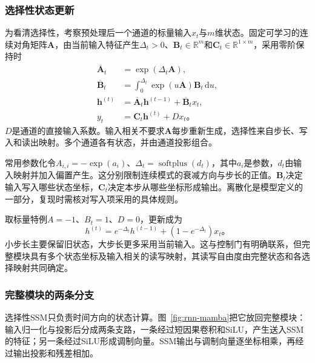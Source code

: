 \subsubsection{选择性状态更新}
\label{sec:rnn-mamba-selection}

为看清选择性，考察预处理后一个通道的标量输入$x_t$与$m$维状态。固定可学习的连续对角矩阵$\bm A$，由当前输入特征产生$\Delta_t>0$、$\bm B_t\in\mathbb R^m$和$\bm C_t\in\mathbb R^{1\times m}$，采用零阶保持时
\begin{equation}
  \begin{aligned}
    \overline{\bm A}_t&=\exp(\Delta_t\bm A),\\
    \overline{\bm B}_t&=\int_0^{\Delta_t}\exp(u\bm A)\bm B_t\,\mathrm du,\\
    \bm h^{(t)}&=\overline{\bm A}_t\bm h^{(t-1)}+\overline{\bm B}_t x_t,\\
    y_t&=\bm C_t\bm h^{(t)}+D x_t\text{。}
  \end{aligned}
  \label{eq:rnn-mamba-selection}
\end{equation}
$D$是通道的直接输入系数。输入相关不要求$\bm A$每步重新生成，选择性来自步长、写入和读出映射。多个通道各有状态，并由通道投影组合。

常用参数化令$A_{i,i}=-\exp(a_i)$、$\Delta_t=\operatorname{softplus}(d_t)$，其中$a_i$是参数，$d_t$由输入映射并加入偏置产生。这分别限制连续模式的衰减方向与步长的正值。$\bm B_t$决定输入写入哪些状态坐标，$\bm C_t$决定本步从哪些坐标形成输出。离散化是模型定义的一部分，复现时需核对写入项采用的具体规则。

取标量特例$A=-1$、$B_t=1$、$D=0$，更新成为
\begin{equation}
  h^{(t)}=e^{-\Delta_t}h^{(t-1)}+(1-e^{-\Delta_t})x_t\text{。}
  \label{eq:rnn-mamba-gate-special-case}
\end{equation}
小步长主要保留旧状态，大步长更多采用当前输入。这与控制门有明确联系，但完整模块具有多个状态坐标及输入相关的读写映射，其读写自由度由完整状态和各选择映射共同确定。

\subsubsection{完整模块的两条分支}
\label{sec:rnn-mamba-architecture}

选择性SSM只负责时间方向的状态计算。图~\ref{fig:rnn-mamba}把它放回完整模块：输入归一化与投影后分成两条支路，一条经过短因果卷积和SiLU，产生送入SSM的特征；另一条经过SiLU形成调制向量。SSM输出与调制向量逐坐标相乘，再经过输出投影和残差相加。

